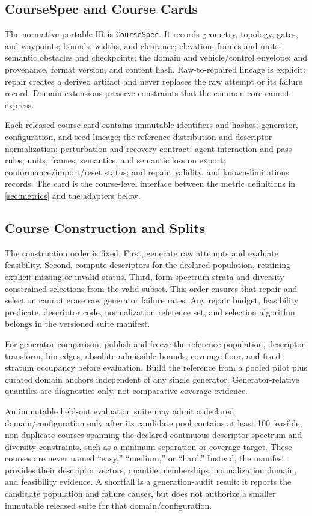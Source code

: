 \subsection{CourseSpec and Course Cards}

The normative portable IR is \texttt{CourseSpec}. It records geometry, topology,
gates, and waypoints; bounds, widths, and clearance; elevation; frames and units;
semantic obstacles and checkpoints; the domain and vehicle/control envelope; and
provenance, format version, and content hash. Raw-to-repaired lineage is explicit:
repair creates a derived artifact and never replaces the raw attempt or its failure
record. Domain extensions preserve constraints that the common core cannot express.

Each released course card contains immutable identifiers and hashes; generator,
configuration, and seed lineage; the reference distribution and descriptor
normalization; perturbation and recovery contract; agent interaction and pass rules;
units, frames, semantics, and semantic loss on export; conformance/import/reset status;
and repair, validity, and known-limitations records. The card is the course-level
interface between the metric definitions in \cref{sec:metrics} and the adapters below.

\subsection{Course Construction and Splits}

The construction order is fixed. First, generate raw attempts and evaluate feasibility.
Second, compute descriptors for the declared population, retaining explicit missing or
invalid status. Third, form spectrum strata and diversity-constrained selections from
the valid subset. This order ensures that repair and selection cannot erase raw
generator failure rates. Any repair budget, feasibility predicate, descriptor code,
normalization reference set, and selection algorithm belongs in the versioned suite
manifest.

For generator comparison, publish and freeze the reference population, descriptor
transform, bin edges, absolute admissible bounds, coverage floor, and fixed-stratum
occupancy before evaluation. Build the reference from a pooled pilot plus curated
domain anchors independent of any single generator. Generator-relative quantiles are
diagnostics only, not comparative coverage evidence.

An immutable held-out evaluation suite may admit a declared domain/configuration only
after its candidate pool contains at least 100 feasible, non-duplicate courses spanning
the declared continuous descriptor spectrum and diversity constraints, such as a
minimum separation or coverage target. These courses are never named ``easy,''
``medium,'' or ``hard.'' Instead, the manifest provides their descriptor vectors,
quantile memberships, normalization domain, and feasibility evidence. A shortfall is a
generation-audit result: it reports the candidate population and failure causes, but
does not authorize a smaller immutable released suite for that domain/configuration.

